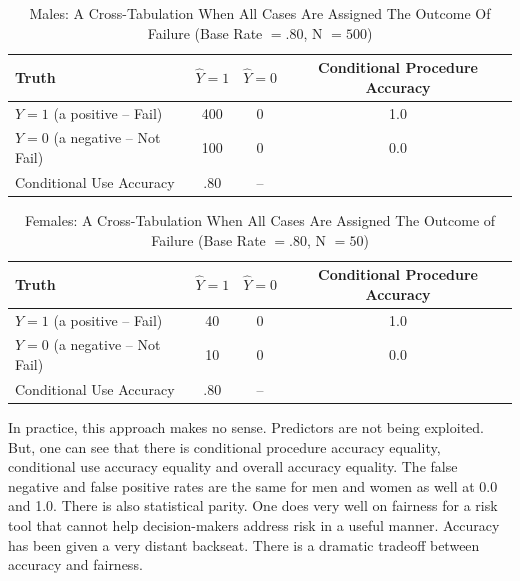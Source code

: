 \documentclass[12pt]{article}
\begin{document}
\begin{table}[htbp]
\footnotesize
\caption{Males: A Cross-Tabulation When All Cases Are Assigned The Outcome Of Failure (Base Rate $= .80$, N $=500$)}
\begin{center}
\begin{tabular}{|l|c|c|c|}
\hline \hline
Truth & $\hat{Y} = 1$ & $\hat{Y} = 0$ & Conditional Procedure Accuracy  \\
\hline
$ Y=1$ (a positive -- Fail) & 400 & 0  & 1.0 \\
\hline
$Y = 0$  (a negative -- Not Fail)& 100 & 0  & 0.0 \\
\hline
Conditional Use Accuracy & .80 & -- & \\
\hline
\hline
\end{tabular}
\end{center}
\label{tab:constantM}
\end{table}

\begin{table}[htbp]
\footnotesize
\caption{Females: A Cross-Tabulation When All Cases Are Assigned The Outcome of Failure (Base Rate $= .80$, N $=50$)}
\begin{center}
\begin{tabular}{|l|c|c|c|}
\hline \hline
Truth & $\hat{Y} = 1$ & $\hat{Y} = 0$ & Conditional Procedure Accuracy  \\
\hline
$ Y=1$ (a positive -- Fail) & 40 & 0  & 1.0 \\
\hline
$Y = 0$  (a negative -- Not Fail)& 10 & 0  & 0.0 \\
\hline
Conditional Use Accuracy  & .80 & -- & \\
\hline
\hline
\end{tabular}
\end{center}
\label{tab:constantF}
\end{table}

In practice, this approach makes no sense. Predictors are not being exploited. But, one can see that there is conditional procedure accuracy equality, conditional use accuracy equality and overall accuracy equality. The false negative and false positive rates are the same for men and women as well  at 0.0 and 1.0. There is also statistical parity. One does very well on fairness for a risk tool that cannot help decision-makers address risk in a useful manner. Accuracy has been given a very distant backseat. There is a dramatic tradeoff between accuracy and fairness.
\end{document}
